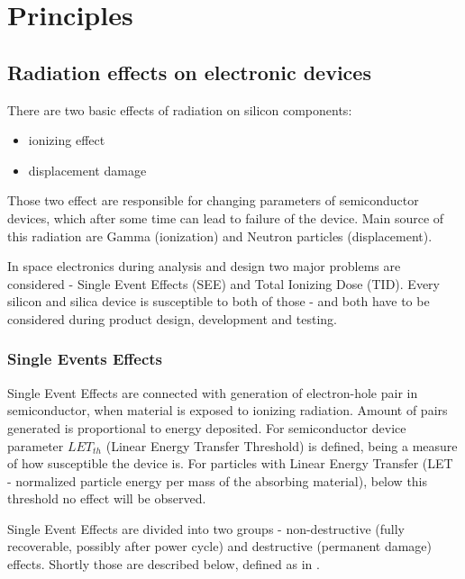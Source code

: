 \chapter{Principles}

\section{Radiation effects on electronic devices}
    There are two basic effects of radiation on silicon components:
    \begin{itemize}
        \item ionizing effect
        \item displacement damage
    \end{itemize}

    Those two effect are responsible for changing parameters of semiconductor devices, which after some time can lead to failure of the device. Main source of this radiation are Gamma (ionization) and Neutron particles (displacement).

    In space electronics during analysis and design two major problems are considered - Single Event Effects (SEE) and Total Ionizing Dose (TID). Every silicon and silica device is susceptible to both of those - and both have to be considered during product design, development and testing.

    \subsection{Single Events Effects}
        Single Event Effects are connected with generation of electron-hole pair in semiconductor, when material is exposed to ionizing radiation. Amount of pairs generated is proportional to energy deposited. For semiconductor device parameter $LET_{th}$ (Linear Energy Transfer Threshold) is defined, being a measure of how susceptible the device is. For particles with Linear Energy Transfer (LET - normalized particle energy per mass of the absorbing material), below this threshold no effect will be observed.

        Single Event Effects are divided into two groups - non-destructive (fully recoverable, possibly after power cycle) and destructive (permanent damage) effects. Shortly those are described below, defined as in \cite{ECSS_Q_ST_60_15C}.

